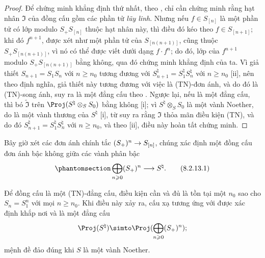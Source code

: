 \documentclass[oneside,10pt]{amsart}
\makeatletter
\renewcommand{\geq}{\geqslant}
\newcommand{\ega@arrow}[2]{\mathchoice{#1}{#2}{#2}{#2}}
\renewcommand{\to}{\ega@arrow{\longrightarrow}{\rightarrow}}
\let\EGAOriginalLabel\label
\renewcommand{\label}[1]{\phantomsection\EGAOriginalLabel{#1}}
\makeatother
\begin{document}
\begin{proof}
Để chứng minh khẳng định thứ nhất, theo , chỉ cần chứng minh rằng hạt nhân $\mathfrak{I}$ của đồng cấu  gồm các phần tử \emph{lũy linh}.
Nhưng nếu $f\in S_{[n]}$ là một phần tử có lớp modulo $S_+S_{[n]}$ thuộc hạt nhân này, thì điều đó kéo theo $f\in S_{[n+1]}$;
khi đó $f^{n+1}$, được xét như một phần tử của $S_{[n(n+1)]}$, cũng thuộc $S_+S_{[n(n+1)]}$, vì nó có thể được viết dưới dạng $f\cdot f^n$;
do đó, lớp của $f^{n+1}$ modulo $S_+S_{[n(n+1)]}$ bằng không, qua đó chứng minh khẳng định của ta.
Vì giả thiết $S_{n+1}=S_1S_n$ với $n\geq n_0$ tương đương với $S_{n+1}^\natural=S_1^\natural S_n^\natural$ với $n\geq n_0$ [ii], nên theo định nghĩa, giả thiết này tương đương với việc  là (TN)-đơn ánh, và do đó là (TN)-song ánh, suy ra  là một đẳng cấu theo .
Ngược lại, nếu  là một đẳng cấu, thì bó $\widetilde{\mathfrak{I}}$ trên $\Proj(S^\natural\otimes_S S_0)$ bằng không [i];
vì $S^\natural\otimes_S S_0$ là một vành Noether, do là một vành thương của $S^\natural$ [i], từ  suy ra rằng $\mathfrak{I}$ thỏa mãn điều kiện (TN), và do đó $S_{n+1}^\natural=S_1^\natural S_n^\natural$ với $n\geq n_0$, và theo [ii], điều này hoàn tất chứng minh.
\end{proof}

\begin{env}[8.2.13]
\label{II.8.2.13}
Bây giờ xét các đơn ánh chính tắc $(S_+)^n\to S_{[n]}$, chúng xác định một đồng cấu đơn ánh bậc không giữa các vành phân bậc
\[
\label{II.8.2.13.1}
  \bigoplus_{n\geq0} (S_+)^n \to S^\natural.
\tag{8.2.13.1}
\]
\end{env}

\begin{proposition}[8.2.14]
\label{II.8.2.14}
Để đồng cấu  là một (TN)-đẳng cấu, điều kiện cần và đủ là tồn tại một $n_0$ sao cho $S_n=S_1^n$ với mọi $n\geq n_0$.
Khi điều này xảy ra, cấu xạ tương ứng với  được xác định khắp nơi và là một đẳng cấu
\[
  \Proj(S^\natural) \simto \Proj(\bigoplus_{n\geq0}(S_+)^n);
\]
mệnh đề đảo đúng khi $S$ là một vành Noether.
\end{proposition}
\end{document}
